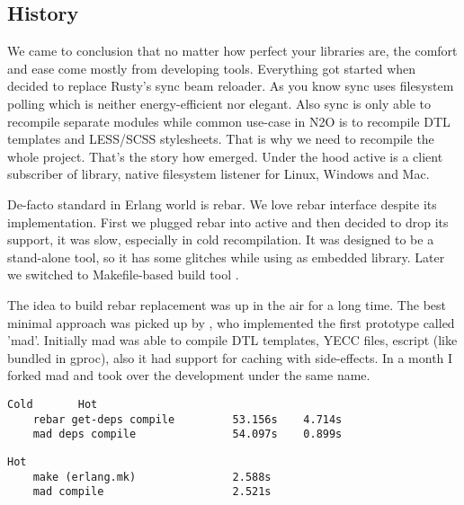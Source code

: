 \subsection{History}

We came to conclusion that no matter how perfect your libraries are,
the comfort and ease come mostly from developing tools.
Everything got started when  decided to
replace Rusty's sync beam reloader. As you know sync uses
filesystem polling which is neither energy-efficient nor elegant. Also
sync is only able to recompile separate modules while
common use-case in N2O is to recompile DTL templates
and LESS/SCSS stylesheets. That is why we need to recompile
the whole project. That's the story how  emerged.
Under the hood active is a client subscriber
of  library, native filesystem listener for Linux, Windows and Mac.

De-facto standard in Erlang world is rebar.
We love rebar interface despite its implementation.
First we plugged rebar into active and then decided to drop its support,
it was slow, especially in cold recompilation.
It was designed to be a stand-alone tool, so it has some
glitches while using as embedded library.
Later we switched to Makefile-based build tool .

The idea to build rebar replacement was up in the air for a long time.
The best minimal approach was picked up by ,
who implemented the first prototype called 'mad'. Initially mad
was able to compile DTL templates, YECC files, escript (like
bundled in gproc), also it had support for caching with side-effects.
In a month I forked mad and took over the development under the same name.

\vspace{1\baselineskip}
\begin{lstlisting}[caption=Example of building N2O sample]
                                   Cold       Hot
    rebar get-deps compile         53.156s    4.714s
    mad deps compile               54.097s    0.899s
\end{lstlisting}
\vspace{1\baselineskip}

\vspace{1\baselineskip}
\begin{lstlisting}[caption=Example of building Cowboy]
                                   Hot
    make (erlang.mk)               2.588s
    mad compile                    2.521s
\end{lstlisting}
\vspace{1\baselineskip}

